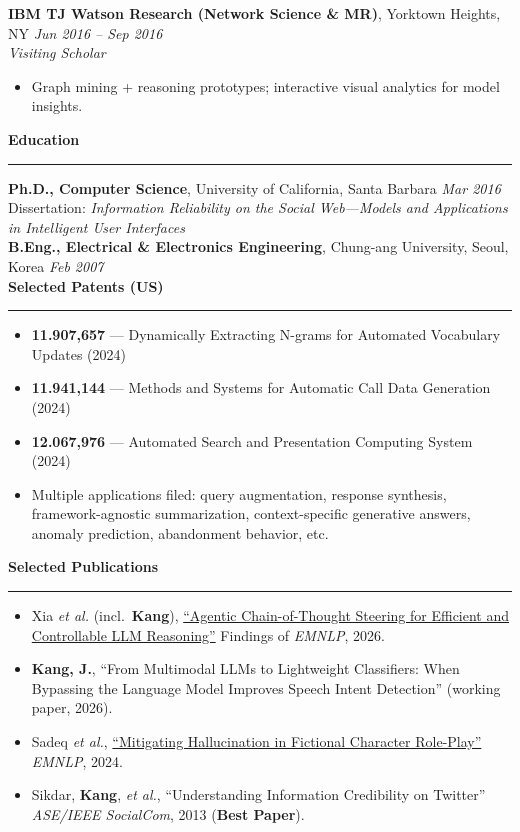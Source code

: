 \documentclass[10pt]{article}
\newcommand{\ressection}[1]{%
  \vspace{0.1em}%
  \textbf{#1}\\[-0.3em]%
  \rule{\linewidth}{0.3pt}%
  \vspace{0.1em}%
}
\begin{document}
\textbf{IBM TJ Watson Research (Network Science \& MR)}, Yorktown Heights, NY \hfill \emph{Jun 2016 -- Sep 2016}\\
\emph{Visiting Scholar}
\begin{itemize}
  \item Graph mining + reasoning prototypes; interactive visual analytics for model insights.
\end{itemize}

\ressection{Education}
\textbf{Ph.D., Computer Science}, University of California, Santa Barbara \hfill \emph{Mar 2016}\\
Dissertation: \emph{Information Reliability on the Social Web---Models and Applications in Intelligent User Interfaces}\\
\textbf{B.Eng., Electrical \& Electronics Engineering}, Chung-ang University, Seoul, Korea \hfill \emph{Feb 2007}\\

\ressection{Selected Patents (US)}%
\begin{itemize}
  \item \textbf{11.907,657} --- Dynamically Extracting N-grams for Automated Vocabulary Updates (2024)
  \item \textbf{11.941,144} --- Methods and Systems for Automatic Call Data Generation (2024)
  \item \textbf{12.067,976} --- Automated Search and Presentation Computing System (2024)
  \item Multiple applications filed: query augmentation, response synthesis, framework-agnostic summarization, context-specific generative answers, anomaly prediction, abandonment behavior, etc.
\end{itemize}

\ressection{Selected Publications}
\begin{itemize}
  \item Xia \emph{et al.} (incl.\ \textbf{Kang}), \href{https://arxiv.org/abs/2606.03965}{``Agentic Chain-of-Thought Steering for Efficient and Controllable LLM Reasoning''} Findings of \emph{EMNLP}, 2026.
  \item \textbf{Kang, J.}, ``From Multimodal LLMs to Lightweight Classifiers: When Bypassing the Language Model Improves Speech Intent Detection'' (working paper, 2026).
  \item Sadeq \emph{et al.}, \href{https://aclanthology.org/2024.findings-emnlp.846/}{``Mitigating Hallucination in Fictional Character Role-Play''} \emph{EMNLP}, 2024.
  \item Sikdar, \textbf{Kang}, \emph{et al.}, ``Understanding Information Credibility on Twitter'' \emph{ASE/IEEE SocialCom}, 2013 (\textbf{Best Paper}).
\end{itemize}
\end{document}
